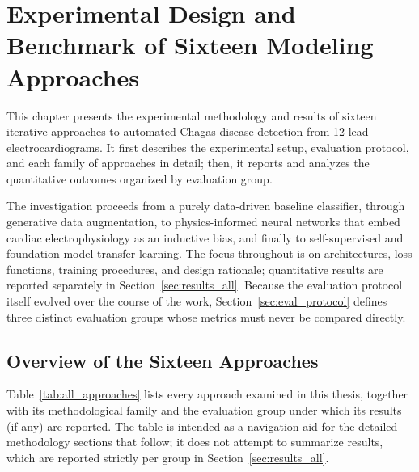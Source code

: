 \chapter{Experimental Design and Benchmark of Sixteen Modeling Approaches}
\label{chap:research}
\label{chap:methodology}

This chapter presents the experimental methodology and results of sixteen iterative approaches to automated Chagas disease detection from 12-lead electrocardiograms. It first describes the experimental setup, evaluation protocol, and each family of approaches in detail; then, it reports and analyzes the quantitative outcomes organized by evaluation group.

The investigation proceeds from a purely data-driven baseline classifier, through generative data augmentation, to physics-informed neural networks that embed cardiac electrophysiology as an inductive bias, and finally to self-supervised and foundation-model transfer learning. The focus throughout is on architectures, loss functions, training procedures, and design rationale; quantitative results are reported separately in Section~\ref{sec:results_all}. Because the evaluation protocol itself evolved over the course of the work, Section~\ref{sec:eval_protocol} defines three distinct evaluation groups whose metrics must never be compared directly.

\section{Overview of the Sixteen Approaches}
\label{sec:approach_overview}

Table~\ref{tab:all_approaches} lists every approach examined in this thesis, together with its methodological family and the evaluation group under which its results (if any) are reported. The table is intended as a navigation aid for the detailed methodology sections that follow; it does not attempt to summarize results, which are reported strictly per group in Section~\ref{sec:results_all}.

